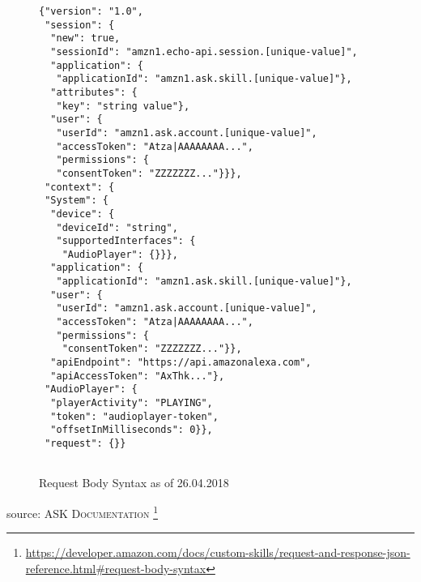 \begin{figure}[H]
	\caption[HTTPS Request Body]{Request Body Syntax as of 26.04.2018 }
	\label{jsonFromAlexa}
\begin{verbatim}
{"version": "1.0",
 "session": {
  "new": true,
  "sessionId": "amzn1.echo-api.session.[unique-value]",
  "application": {
   "applicationId": "amzn1.ask.skill.[unique-value]"},
  "attributes": {
   "key": "string value"},
  "user": {
   "userId": "amzn1.ask.account.[unique-value]",
   "accessToken": "Atza|AAAAAAAA...",
   "permissions": {
   "consentToken": "ZZZZZZZ..."}}},
 "context": {
 "System": {
  "device": {
   "deviceId": "string",
   "supportedInterfaces": {
    "AudioPlayer": {}}},
  "application": {
   "applicationId": "amzn1.ask.skill.[unique-value]"},
  "user": {
   "userId": "amzn1.ask.account.[unique-value]",
   "accessToken": "Atza|AAAAAAAA...",
   "permissions": {
    "consentToken": "ZZZZZZZ..."}},
  "apiEndpoint": "https://api.amazonalexa.com",
  "apiAccessToken": "AxThk..."},
 "AudioPlayer": {
  "playerActivity": "PLAYING",
  "token": "audioplayer-token",
  "offsetInMilliseconds": 0}},
 "request": {}}
	
	\end{verbatim}
\end{figure}

source: \textsc{ASK Documentation} \footnote{\url{https://developer.amazon.com/docs/custom-skills/request-and-response-json-reference.html\#request-body-syntax}}




\newpage
{}
